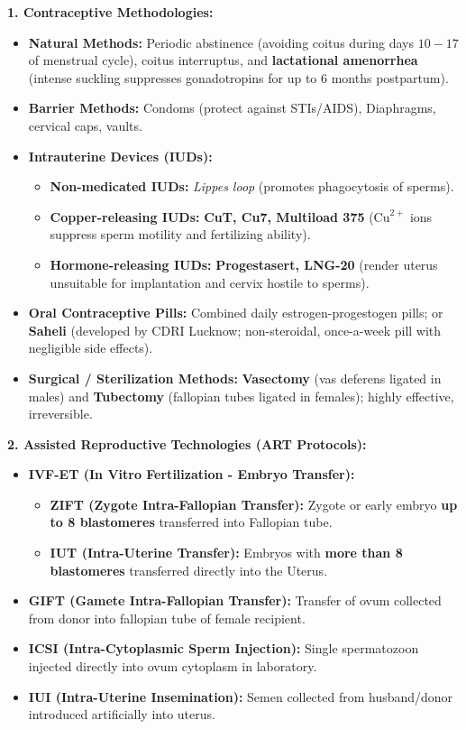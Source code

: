 \documentclass[10pt,twoside,openright]{book}
\begin{document}
\begin{conceptbox}
\textbf{1. Contraceptive Methodologies:}
\begin{itemize}[leftmargin=*]
  \item \textbf{Natural Methods:} Periodic abstinence (avoiding coitus during days $10-17$ of menstrual cycle), coitus interruptus, and \textbf{lactational amenorrhea} (intense suckling suppresses gonadotropins for up to 6 months postpartum).
  \item \textbf{Barrier Methods:} Condoms (protect against STIs/AIDS), Diaphragms, cervical caps, vaults.
  \item \textbf{Intrauterine Devices (IUDs):}
  \begin{itemize}
    \item \textbf{Non-medicated IUDs:} \textit{Lippes loop} (promotes phagocytosis of sperms).
    \item \textbf{Copper-releasing IUDs:} \textbf{CuT, Cu7, Multiload 375} ($\mathrm{Cu}^{2+}$ ions suppress sperm motility and fertilizing ability).
    \item \textbf{Hormone-releasing IUDs:} \textbf{Progestasert, LNG-20} (render uterus unsuitable for implantation and cervix hostile to sperms).
  \end{itemize}
  \item \textbf{Oral Contraceptive Pills:} Combined daily estrogen-progestogen pills; or \textbf{Saheli} (developed by CDRI Lucknow; non-steroidal, once-a-week pill with negligible side effects).
  \item \textbf{Surgical / Sterilization Methods:} \textbf{Vasectomy} (vas deferens ligated in males) and \textbf{Tubectomy} (fallopian tubes ligated in females); highly effective, irreversible.
\end{itemize}

\textbf{2. Assisted Reproductive Technologies (ART Protocols):}
\begin{itemize}[leftmargin=*]
  \item \textbf{IVF-ET (In Vitro Fertilization - Embryo Transfer):}
  \begin{itemize}
    \item \textbf{ZIFT (Zygote Intra-Fallopian Transfer):} Zygote or early embryo \textbf{up to 8 blastomeres} transferred into Fallopian tube.
    \item \textbf{IUT (Intra-Uterine Transfer):} Embryos with \textbf{more than 8 blastomeres} transferred directly into the Uterus.
  \end{itemize}
  \item \textbf{GIFT (Gamete Intra-Fallopian Transfer):} Transfer of ovum collected from donor into fallopian tube of female recipient.
  \item \textbf{ICSI (Intra-Cytoplasmic Sperm Injection):} Single spermatozoon injected directly into ovum cytoplasm in laboratory.
  \item \textbf{IUI (Intra-Uterine Insemination):} Semen collected from husband/donor introduced artificially into uterus.
\end{itemize}
\end{conceptbox}
\end{document}
